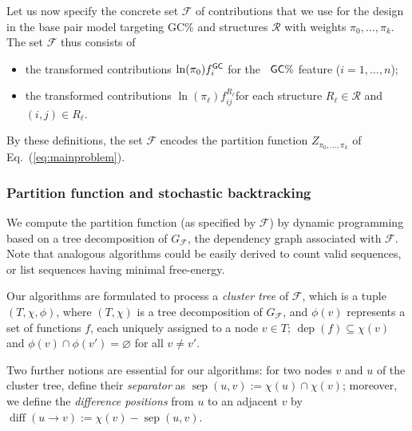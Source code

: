 \documentclass[]{bmcart}
\newcommand{\dep}{\operatorname{dep}}
\newcommand{\partfun}[1]{Z_{#1}}
\newcommand{\separator}[2]{\operatorname{sep}(#1,#2)}
\newcommand{\difference}[2]{\operatorname{diff}(#1 \rightarrow #2)}
\newcommand{\F}{\mathcal{F}}
\newcommand{\R}{\mathcal{R}}
\newcommand{\Def}[1]{\emph{#1}}
\newcommand{\Nuc}[1]{{\sf #1}}
\newcommand{\Cb}{\Nuc{C}}
\newcommand{\Gb}{\Nuc{G}}
\newcommand{\GCb}{\Gb\Cb}
\begin{document}
%
Let us now specify the concrete set $\F$ of contributions that we use
for the design in the base pair model targeting \GCb\% and structures $\R$ with weights $\pi_0,\dots,\pi_k$. The set $\F$ thus consists of
\begin{itemize}
\item the transformed contributions $\ln(\pi_0)f^{\GCb}_i$ for the ~$\GCb\%$ feature ($i=1,\dots,n$);
\item the transformed contributions $\ln(\pi_\ell)f^{R_\ell}_{ij}$for each structure $R_\ell\in\R$ and $(i,j)\in R_\ell.$
\end{itemize}

By these definitions, the set $\F$ encodes the partition function $\partfun{\pi_0,\dots,\pi_k}$ of Eq.~(\ref{eq:mainproblem}).

\subsubsection*{Partition function and stochastic backtracking}\label{sec:PF}

We compute the partition function (as specified by $\F$) by dynamic programming based
on a tree decomposition of $G_{\F}$, the dependency graph associated with $\F$.
Note that analogous algorithms could be easily derived to count valid sequences, or list sequences having minimal free-energy.

%

Our algorithms are formulated to process a \Def{cluster tree} of $\F$, which is a tuple $(T,\chi,\phi)$, where
$(T,\chi)$ is a tree decomposition of $G_\F$, and $\phi(v)$ represents
a set of functions $f$, each uniquely assigned to a node $v\in T$;
$\dep(f)\subseteq\chi(v)$ and $\phi(v)\cap \phi(v')=\varnothing$ for
all $v\neq v'$. 

Two further notions are essential for our algorithms: for two nodes $v$ and $u$ of the cluster tree, define
their \Def{separator} as $\separator{u}{v} := \chi(u)\cap\chi(v)$;
moreover, we define the \Def{difference positions} from $u$ to an
adjacent $v$ by $\difference{u}{v}:=\chi(v) - \separator{u}{v}$.
\end{document}
